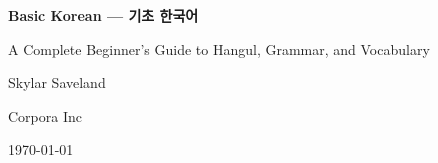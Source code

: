 \begin{titlepage}
    \centering
    \vspace*{1in}
    {\Huge\bfseries Basic Korean — 기초 한국어\par}
    {\Large A Complete Beginner's Guide to Hangul, Grammar, and Vocabulary\par}
    \vspace{1in}
    {\Large Skylar Saveland\par}
    {\Large Corpora Inc\par}
    \vfill
    {\large \today\par}
\end{titlepage}
